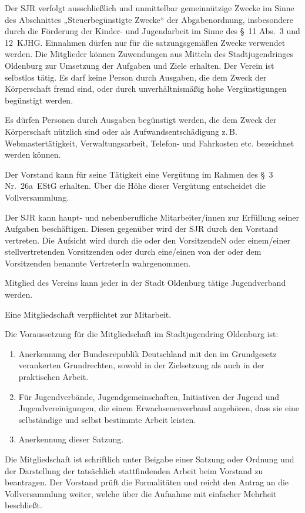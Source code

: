 \documentclass[10pt,a4paper,oneside,parskip=half]{scrartcl}
\begin{document}
\begin{contract}
Der SJR verfolgt ausschließlich und unmittelbar gemeinnützige Zwecke im Sinne des Abschnittes „Steuerbegünstigte Zwecke“ der Abgabenordnung, insbesondere durch die Förderung der Kinder- und Jugendarbeit im Sinne des §~11 Abs.~3 und 12~KJHG. Einnahmen dürfen nur für die satzungsgemäßen Zwecke verwendet werden. Die Mitglieder können Zuwendungen aus Mitteln des Stadtjugendringes Oldenburg zur Umsetzung der Aufgaben und Ziele erhalten. Der Verein ist selbstlos tätig. Es darf keine Person durch Ausgaben, die dem Zweck der Körperschaft fremd sind, oder durch unverhältnismäßig hohe Vergünstigungen begünstigt werden.

Es dürfen Personen durch Ausgaben begünstigt werden, die dem Zweck der Körperschaft nützlich sind oder als Aufwandsentschädigung z.\,B. Webmastertätigkeit, Verwaltungsarbeit, Telefon- und Fahrkosten etc. bezeichnet werden können.

Der Vorstand kann für seine Tätigkeit eine Vergütung im Rahmen des §~3 Nr.~26a~EStG erhalten. Über die Höhe dieser Vergütung entscheidet die Vollversammlung.

Der SJR kann haupt- und nebenberufliche Mitarbeiter/innen zur Erfüllung seiner Aufgaben beschäftigen. Diesen gegenüber wird der SJR durch den Vorstand vertreten. Die Aufsicht wird durch die oder den VorsitzendeN oder einem/einer stellvertretenden Vorsitzenden oder durch eine/einen von der oder dem Vorsitzenden benannte VertreterIn wahrgenommen.

Mitglied des Vereins kann jeder in der Stadt Oldenburg tätige Jugendverband werden.

Eine Mitgliedschaft verpflichtet zur Mitarbeit.\label{mitgliedschaft_mitarbeit}

Die Voraussetzung für die Mitgliedschaft im Stadtjugendring Oldenburg ist:
\begin{enumerate}
\item Anerkennung der Bundesrepublik Deutschland mit den im Grundgesetz verankerten Grundrechten, sowohl in der Zielsetzung als auch in der praktischen Arbeit.
\item Für Jugendverbände, Jugendgemeinschaften, Initiativen der Jugend und Jugendvereinigungen, die einem Erwachsenenverband angehören, dass sie eine selbständige und selbst bestimmte Arbeit leisten.
\item Anerkennung dieser Satzung.
\end{enumerate}

Die Mitgliedschaft ist schriftlich unter Beigabe einer Satzung oder Ordnung und der Darstellung der tatsächlich stattfindenden Arbeit beim Vorstand zu beantragen. Der Vorstand prüft die Formalitäten und reicht den Antrag an die Vollversammlung weiter, welche über die Aufnahme mit einfacher Mehrheit beschließt.


\end{contract}
\end{document}
